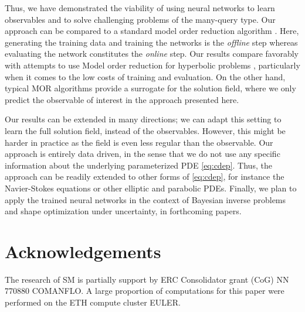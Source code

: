 \documentclass[a4paper]{article}
\numberwithin{equation}{section}
\numberwithin{equation}{section}
\theoremstyle{definition}
\theoremstyle{myremarkstyle}
\begin{document}
Thus, we have demonstrated the viability of using neural networks to learn observables and to solve challenging problems of the many-query type. Our approach can be compared to a standard model order reduction algorithm \cite{MORbook}. Here, generating the training data and training the networks is the \emph{offline} step whereas evaluating the network constitutes the \emph{online} step. Our results compare favorably with attempts to use Model order reduction for hyperbolic problems \cite{AAC,Cris1}, particularly when it comes to the low costs of training and evaluation. On the other hand, typical MOR algorithms provide a surrogate for the solution field, where we only predict the observable of interest in the approach presented here. 

Our results can be extended in many directions; we can adapt this setting to learn the full solution field, instead of the observables. However, this might be harder in practice as the field is even less regular than the observable. Our approach is entirely data driven, in the sense that we do not use any specific information about the underlying parameterized PDE \eqref{eq:cdep}. Thus, the approach can be readily extended to other forms of \eqref{eq:cdep}, for instance the Navier-Stokes equations or other elliptic and parabolic PDEs. Finally, we plan to apply the trained neural networks in the context of Bayesian inverse problems and shape optimization under uncertainty, in forthcoming papers. 







\section*{Acknowledgements}
The research of SM is partially support by ERC Consolidator grant (CoG) NN 770880 COMANFLO. A large proportion of computations for this paper were performed on the
ETH compute cluster EULER.
\end{document}
